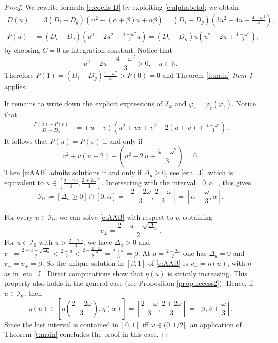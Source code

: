 \documentclass[11pt,a4paper]{article}
\newcommand{\R}{\mathbb R}
\begin{document}
\begin{proof}
We rewrite formula \eqref{e:coeffs D} by exploiting \eqref{e:alphabeta}; we obtain 
\begin{align}
D(u)&=3(D_i-D_g)\left(u^2 -(\alpha+\beta)u+\alpha\beta \right)
= (D_i-D_g)\left(3u^2 -4 u+\frac{4-\omega^2}{3}\right),
\label{e:DDD}
\\
P(u)&=(D_i-D_g)\left(u^3 - 2u^2+\frac{4-\omega^2}{3}u \right)=(D_i-D_g)u\left(u^2 - 2u+\frac{4-\omega^2}{3}\right),
\nonumber
\end{align}
by choosing $C=0$ as integration constant. Notice that 
\begin{equation}\label{e:eoer}
u^2 - 2u+\frac{4-\omega^2}{3}>0, \quad u\in\R.
\end{equation}
%
Therefore $P(1)=(D_i-D_g)\frac{1-\omega^2}{3}>P(0)=0$ and Theorem \ref{t:main} {\em Item 1} applies.
\par

It remains to write down the explicit expressions of $\mathcal I_\omega$ and $\varphi_r=\varphi_r(\varphi_\ell)$. Notice that
\begin{equation} 
\label{e:A}
\begin{aligned}
\frac{P(u)-P(v)}{D_i-D_g}&
=(u-v)\left(u^2+uv+v^2-2(u+v)+ \frac{4-\omega^2}{3}\right).
\end{aligned}
\end{equation}
It follows that $P(u)=P(v)$ if and only if
	\begin{equation}
	\label{e:AAB}
	v^2+v(u-2)+\left(u^2-2\,u+\frac{4-\omega^2}{3}\right)=0.
	\end{equation}
Then \eqref{e:AAB} admits solutions if and only if $\Delta_u \ge 0$, see \eqref{eta_J}, which is equivalent to $u \in \left[\frac{2-2\omega}{3}, \frac{2+2\omega}{3}\right]$.
Intersecting with the interval $[0,\alpha]$, this gives
\[
\mathcal I_0:=\left[\Delta_u \ge 0\right] \cap [0,\alpha]= \left[\frac{2-2\omega}{3}, \frac{2-\omega}{3}\right]=\left[\alpha-\frac{\omega}{3}, \alpha\right].
\]

For every $u \in \mathcal I_0$, we can solve \eqref{e:AAB} with respect to $v$, obtaining
\[
v_\pm=\frac{2-u\pm \sqrt{\Delta_u}}{2}.
\]
For $u \in \mathcal I_0$ with $u>\frac{2-2\omega}{3}$, we have $\Delta_u>0$ and $
v_-=\frac{2-u-\sqrt{\Delta_u}}{2}<\frac{2-u}{2}< \frac{2-\frac{2-2\omega}{3}}{2}=\frac{2+\omega}{3}=\beta$.
At $u=\frac{2-2\omega}{3}$ one has $\Delta_u=0$ and $v_-=v_+=\beta$.
So the unique solution in $[\beta,1]$ of \eqref{e:AAB} is  
$v_+=\eta(u)$, with $\eta$ as in \eqref{eta_J}.
Direct computations show that $\eta(u)$ is strictly increasing. This property also holds in the general case (see Proposition \ref{prop:necess2}). Hence, if $u \in \mathcal I_0$, then 
\[
\eta(u) \in \left[\eta\left(\frac{2-2\omega}{3}\right), \eta\left(\alpha \right)\right] = \left[\frac{2+\omega}{3},\frac{2+2\omega}{3}\right]=\left[\beta, \beta+\frac{\omega}{3}\right].
\]
Since the last interval is contained in $[0,1]$ iff $\omega \in (0,1/2]$, an application of Theorem \ref{t:main} concludes the proof in this case.


\end{proof}
\end{document}
